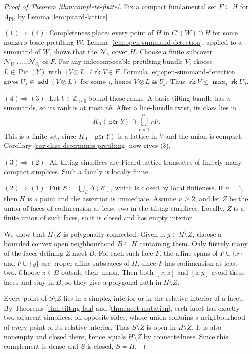 \documentclass[a4paper,reqno]{amsart}
\def\E{\mathcal{E}}
\def\La{\Lambda}
\DeclareMathOperator{\add}{\mathsf{add}}
\DeclareMathOperator{\per}{\mathsf{per}}
\DeclareMathOperator{\Pic}{Pic}
\DeclareMathOperator{\rk}{rk}
\theoremstyle{definition}
\begin{document}
\begin{proof}[Proof of Theorem \ref{thm:complete-finite}]
Fix a compact fundamental set $F\subseteq H$ for $\La_{\mathrm{Pic}}$ by Lemma \ref{lem:picard-lattice}.

$(1)\Rightarrow(4)$: Completeness places every point of $H$ in $C^\circ(W)\cap H$ for some nonzero basic pretilting $W$. Lemma \ref{lem:open-summand-detection}, applied to a summand of $W$, shows that the $\mathcal N_U$ cover $H$. Choose a finite subcover $\mathcal N_{U_1},\ldots,\mathcal N_{U_t}$ of $F$. For any indecomposable pretilting bundle $V$, choose $L\in\Pic(Y)$ with $[V\otimes L]/\rk V\in F$. Formula \eqref{eq:open-summand-detection} gives $U_j\in\add(V\otimes L)$ for some $j$, hence $V\otimes L\cong U_j$. Thus $\rk V\le\max_j\rk U_j$.

$(4)\Rightarrow(3)$: Let $b\in\mathbb Z_{>0}$ bound these ranks. A basic tilting bundle has $n$ summands, so its rank is at most $nb$. After a line-bundle twist, its class lies in
\[
K_0(\per Y)\cap\bigcup_{r=1}^{nb}rF.
\]
This is a finite set, since $K_0(\per Y)$ is a lattice in $V$ and the union is compact. Corollary \ref{cor:class-determines-pretilting} now gives (3).

$(3)\Rightarrow(2)$: All tilting simplices are Picard-lattice translates of finitely many compact simplices. Such a family is locally finite.

$(2)\Rightarrow(1)$: Put $S:=\bigcup_\E\Delta(\E)$, which is closed by local finiteness. If $n=1$, then $H$ is a point and the assertion is immediate. Assume $n\ge2$, and let $Z$ be the union of faces of codimension at least two in the tilting simplices. Locally, $Z$ is a finite union of such faces, so it is closed and has empty interior.

We show that $H\setminus Z$ is polygonally connected. Given $x,y\in H\setminus Z$, choose a bounded convex open neighbourhood $B\subseteq H$ containing them. Only finitely many of the faces defining $Z$ meet $\overline B$. For each such face $F$, the affine spans of $F\cup\{x\}$ and $F\cup\{y\}$ are proper affine subspaces of $H$, since $F$ has codimension at least two. Choose $z\in B$ outside their union. Then both $[x,z]$ and $[z,y]$ avoid these faces and stay in $B$, so they give a polygonal path in $H\setminus Z$.

Every point of $S\setminus Z$ lies in a simplex interior or in the relative interior of a facet. By Theorems \ref{thm:tilting-fan} and \ref{thm:facet-mutation}, each facet has exactly two adjacent simplices, on opposite sides, whose union contains a neighbourhood of every point of its relative interior. Thus $S\setminus Z$ is open in $H\setminus Z$. It is also nonempty and closed there, hence equals $H\setminus Z$ by connectedness. Since this complement is dense and $S$ is closed, $S=H$.
\end{proof}
\end{document}
